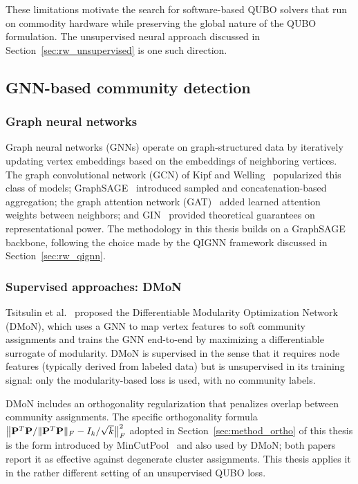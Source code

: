 These limitations motivate the search for software-based QUBO
solvers that run on commodity hardware while preserving the global
nature of the QUBO formulation. The unsupervised neural approach
discussed in Section~\ref{sec:rw_unsupervised} is one such direction.

\subsection{GNN-based community detection}
\label{sec:rw_gnn_cd}

\subsubsection{Graph neural networks}
\label{sec:rw_gnn_arch}

Graph neural networks (GNNs) operate on graph-structured data by
iteratively updating vertex embeddings based on the embeddings of
neighboring vertices. The graph convolutional network (GCN) of Kipf
and Welling~\cite{kipf2017semi} popularized this class of models;
GraphSAGE~\cite{hamilton2017inductive} introduced sampled and
concatenation-based aggregation; the graph attention network
(GAT)~\cite{velickovic2018graph} added learned attention weights
between neighbors; and GIN~\cite{xu2019gin} provided theoretical
guarantees on representational power. The methodology in this
thesis builds on a GraphSAGE backbone, following the choice made by
the QIGNN framework discussed in Section~\ref{sec:rw_qignn}.

\subsubsection{Supervised approaches: DMoN}
\label{sec:rw_dmon}

Tsitsulin et al.~\cite{tsitsulin2020graph} proposed the
Differentiable Modularity Optimization Network (DMoN), which uses
a GNN to map vertex features to soft community assignments and
trains the GNN end-to-end by maximizing a differentiable surrogate
of modularity. DMoN is supervised in the sense that it requires
node features (typically derived from labeled data) but is
unsupervised in its training signal: only the modularity-based loss
is used, with no community labels.

DMoN includes an orthogonality regularization that penalizes
overlap between community assignments. The specific orthogonality
formula
$\bigl\| \mathbf{P}^T \mathbf{P} / \| \mathbf{P}^T \mathbf{P} \|_F - I_k / \sqrt{k} \bigr\|_F^2$
adopted in Section~\ref{sec:method_ortho} of this thesis is the
form introduced by MinCutPool~\cite{bianchi2020spectral} and also
used by DMoN; both papers report it as effective against
degenerate cluster assignments. This thesis applies it in the
rather different setting of an unsupervised QUBO loss.

